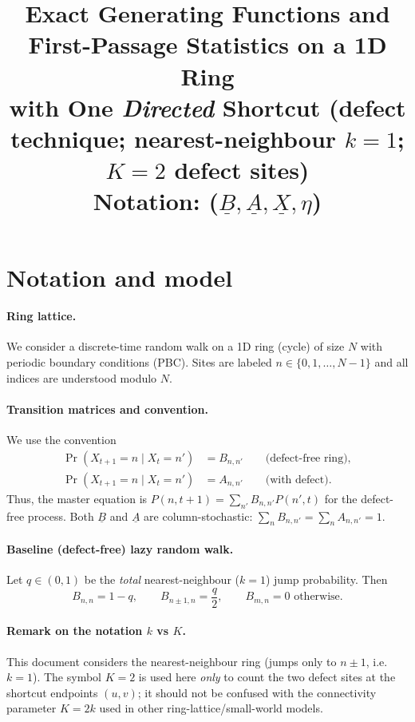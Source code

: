 \documentclass[11pt]{article}
\title{Exact Generating Functions and First-Passage Statistics on a 1D Ring\\
with One \emph{Directed} Shortcut (defect technique; nearest-neighbour $k=1$; $K=2$ defect sites)\\
\large Notation: ($\underline{B},\underline{A},\underline{X},\eta$)}
\author{}
\date{}
\begin{document}
\maketitle

\section*{Notation and model}

\paragraph{Ring lattice.}
We consider a discrete-time random walk on a 1D ring (cycle) of size $N$ with periodic boundary conditions (PBC).
Sites are labeled $n\in\{0,1,\dots,N-1\}$ and all indices are understood modulo $N$.

\paragraph{Transition matrices and convention.}
We use the convention
\[
\begin{aligned}
\Pr(X_{t+1}=n\mid X_t=n') &= B_{n,n'} \qquad \text{(defect-free ring)},\\
\Pr(X_{t+1}=n\mid X_t=n') &= A_{n,n'} \qquad \text{(with defect)}.
\end{aligned}
\]
Thus, the master equation is $P(n,t+1)=\sum_{n'} B_{n,n'} P(n',t)$ for the defect-free process.
Both $\underline{B}$ and $\underline{A}$ are column-stochastic: $\sum_n B_{n,n'}=\sum_n A_{n,n'}=1$.

\paragraph{Baseline (defect-free) lazy random walk.}
Let $q\in(0,1)$ be the \emph{total} nearest-neighbour ($k=1$) jump probability. Then
\[
B_{n,n}=1-q,\qquad B_{n\pm 1,n}=\frac{q}{2},\qquad B_{m,n}=0\text{ otherwise}.
\]

\paragraph{Remark on the notation $k$ vs $K$.}
This document considers the nearest-neighbour ring (jumps only to $n\pm 1$, i.e.\ $k=1$).
The symbol $K=2$ is used here \emph{only} to count the two defect sites at the shortcut endpoints $(u,v)$;
it should not be confused with the connectivity parameter $K=2k$ used in other ring-lattice/small-world models.
\end{document}
